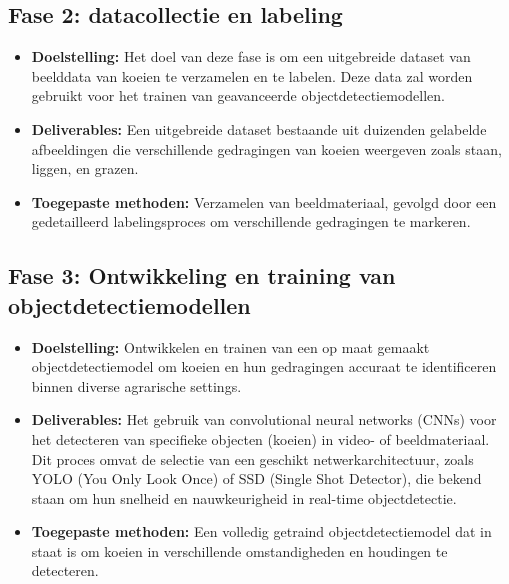 \subsection{Fase 2: datacollectie en labeling}
\begin{itemize}
    \item \textbf{Doelstelling:} Het doel van deze fase is om een uitgebreide dataset van beelddata van koeien te verzamelen en te labelen. Deze data zal worden gebruikt voor het trainen van geavanceerde objectdetectiemodellen.
    \item \textbf{Deliverables:} Een uitgebreide dataset bestaande uit duizenden gelabelde afbeeldingen die verschillende gedragingen van koeien weergeven zoals staan, liggen, en grazen.
    \item \textbf{Toegepaste methoden:} Verzamelen van beeldmateriaal, gevolgd door een gedetailleerd labelingsproces om verschillende gedragingen te markeren.
\end{itemize}
\subsection{Fase 3: Ontwikkeling en training van objectdetectiemodellen}
\begin{itemize}
    \item \textbf{Doelstelling:} Ontwikkelen en trainen van een op maat gemaakt objectdetectiemodel om koeien en hun gedragingen accuraat te identificeren binnen diverse agrarische settings.
    \item \textbf{Deliverables:} Het gebruik van convolutional neural networks (CNNs) voor het detecteren van specifieke objecten (koeien) in video- of beeldmateriaal. Dit proces omvat de selectie van een geschikt netwerkarchitectuur, zoals YOLO (You Only Look Once) of SSD (Single Shot Detector), die bekend staan om hun snelheid en nauwkeurigheid in real-time objectdetectie.
    \item \textbf{Toegepaste methoden:} Een volledig getraind objectdetectiemodel dat in staat is om koeien in verschillende omstandigheden en houdingen te detecteren.
\end{itemize}
